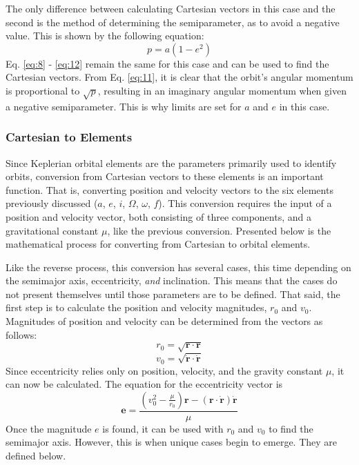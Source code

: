 The only difference between calculating Cartesian vectors in this case and the second is the method of determining the semiparameter, as to avoid a negative value. This is shown by the following equation:
\begin{equation}
p = a (1-e^2)
\end{equation}
Eq. \ref{eq:8} - \ref{eq:12} remain the same for this case and can be used to find the Cartesian vectors. From Eq. \ref{eq:11}, it is clear that the orbit's angular momentum is proportional to $\sqrt{p}$, resulting in an imaginary angular momentum when given a negative semiparameter. This is why limits are set for $a$ and $e$ in this case.

\subsubsection{Cartesian to Elements}
Since Keplerian orbital elements are the parameters primarily used to identify orbits, conversion from Cartesian vectors to these elements is an important function. That is, converting position and velocity vectors to the six elements previously discussed ($a$, $e$, $i$, $\Omega$, $\omega$, $f$). This conversion requires the input of a position and velocity vector, both consisting of three components, and a gravitational constant $\mu$, like the previous conversion. Presented below is the mathematical process for converting from Cartesian to orbital elements.

Like the reverse process, this conversion has several cases, this time depending on the semimajor axis, eccentricity, \textit{and} inclination. This means that the cases do not present themselves until those parameters are to be defined. That said, the first step is to calculate the position and velocity magnitudes, $r_0$ and $v_0$. Magnitudes of position and velocity can be determined from the vectors as follows:
\begin{equation}
r_0 = \sqrt{\bm{r} \cdot \bm{r}}
\end{equation}
\begin{equation}
v_0 = \sqrt{\bm{\dot{r}} \cdot \bm{\dot{r}}}
\end{equation}
Since eccentricity relies only on position, velocity, and the gravity constant $\mu$, it can now be calculated. The equation for the eccentricity vector is
\begin{equation} \label{eq:18}
\bm{e} = \frac{(v_0^2-\frac{\mu}{r_0})\bm{r} - (\bm{r} \cdot \bm{\dot{r}})\bm{\dot{r}}}{\mu}
\end{equation}
Once the magnitude $e$ is found, it can be used with $r_0$ and $v_0$ to find the semimajor axis. However, this is when unique cases begin to emerge. They are defined below.\\

